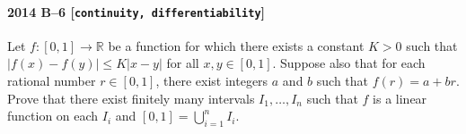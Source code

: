 \paragraph{2014 B--6 \textnormal{[\texttt{continuity, differentiability}]}}
Let $f: [0,1] \to \mathbb{R}$ be a function for which there exists a constant $K>0$
such that $\left| f(x) - f(y) \right| \leq K \left| x - y \right|$ for all $x,y \in [0,1]$.
Suppose also that for each rational number $r \in [0,1]$, there exist integers $a$ and $b$
such that $f(r) = a + br$. Prove that there exist finitely many intervals $I_1, \dots, I_n$
such that $f$ is a linear function on each $I_i$ and $[0,1] = \bigcup_{i=1}^n I_i$.

